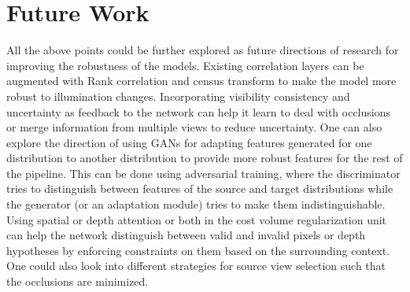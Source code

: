 \section{Future Work}
All the above points could be further explored as future directions of research for improving the robustness of the models. Existing correlation layers can be augmented with Rank correlation and census transform to make the model more robust to illumination changes. Incorporating visibility consistency and uncertainty as feedback to the network can help it learn to deal with occlusions or merge information from multiple views to reduce uncertainty. One can also explore the direction of using GANs for adapting features generated for one distribution to another distribution to provide more robust features for the rest of the {\mvs} pipeline. This can be done using adversarial training, where the discriminator tries to distinguish between features of the source and target distributions while the generator (or an adaptation module) tries to make them indistinguishable. Using spatial or depth attention or both in the cost volume regularization unit can help the network distinguish between valid and invalid pixels or depth hypotheses by enforcing constraints on them based on the surrounding context. One could also look into different strategies for source view selection such that the occlusions are minimized.\par


